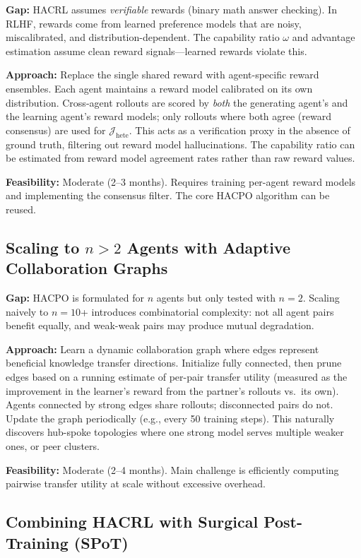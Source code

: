 \documentclass[11pt]{article}
\begin{document}
\textbf{Gap:} HACRL assumes \emph{verifiable} rewards (binary math answer checking). In RLHF, rewards come from learned preference models that are noisy, miscalibrated, and distribution-dependent. The capability ratio $\omega$ and advantage estimation assume clean reward signals---learned rewards violate this.

\textbf{Approach:} Replace the single shared reward with agent-specific reward ensembles. Each agent maintains a reward model calibrated on its own distribution. Cross-agent rollouts are scored by \emph{both} the generating agent's and the learning agent's reward models; only rollouts where both agree (reward consensus) are used for $\mathcal{J}_{\text{hete}}$. This acts as a verification proxy in the absence of ground truth, filtering out reward model hallucinations. The capability ratio can be estimated from reward model agreement rates rather than raw reward values.

\textbf{Feasibility:} Moderate (2--3 months). Requires training per-agent reward models and implementing the consensus filter. The core HACPO algorithm can be reused.

\subsection{Scaling to $n > 2$ Agents with Adaptive Collaboration Graphs}

\textbf{Gap:} HACPO is formulated for $n$ agents but only tested with $n{=}2$. Scaling naively to $n{=}10$+ introduces combinatorial complexity: not all agent pairs benefit equally, and weak-weak pairs may produce mutual degradation.

\textbf{Approach:} Learn a dynamic collaboration graph where edges represent beneficial knowledge transfer directions. Initialize fully connected, then prune edges based on a running estimate of per-pair transfer utility (measured as the improvement in the learner's reward from the partner's rollouts vs.\ its own). Agents connected by strong edges share rollouts; disconnected pairs do not. Update the graph periodically (e.g., every 50 training steps). This naturally discovers hub-spoke topologies where one strong model serves multiple weaker ones, or peer clusters.

\textbf{Feasibility:} Moderate (2--4 months). Main challenge is efficiently computing pairwise transfer utility at scale without excessive overhead.

\subsection{Combining HACRL with Surgical Post-Training (SPoT)}
\end{document}
